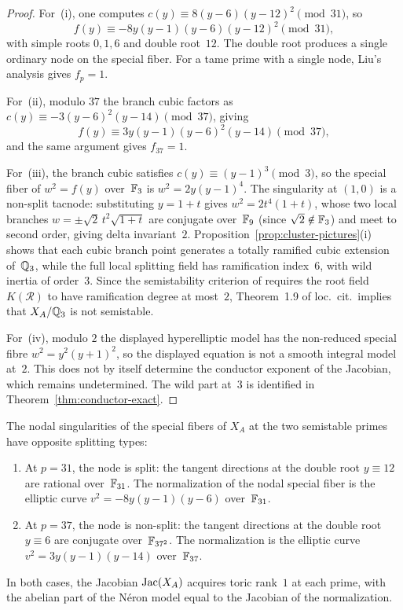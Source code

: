 \begin{proof}
For~(i), one computes \(c(y)\equiv 8(y-6)(y-12)^2\pmod{31}\), so
\[
f(y)\equiv -8y(y-1)(y-6)(y-12)^2\pmod{31},
\]
with simple roots \(0,1,6\) and double root~\(12\). The double root produces a single ordinary node on the special fiber. For a tame prime with a single node, Liu's analysis \cite{Liu2002} gives \(f_p=1\).

For~(ii), modulo \(37\) the branch cubic factors as \(c(y)\equiv -3(y-6)^2(y-14)\pmod{37}\), giving
\[
f(y)\equiv 3y(y-1)(y-6)^2(y-14)\pmod{37},
\]
and the same argument gives \(f_{37}=1\).

For~(iii), the branch cubic satisfies \(c(y)\equiv (y-1)^3\pmod{3}\), so the special fiber of \(w^2=f(y)\) over~\(\mathbb{F}_3\) is \(w^2=2y(y-1)^4\). The singularity at \((1,0)\) is a non-split tacnode: substituting \(y=1+t\) gives \(w^2=2t^4(1+t)\), whose two local branches \(w=\pm\sqrt{2}\,t^2\sqrt{1+t}\) are conjugate over~\(\mathbb{F}_9\) (since \(\sqrt{2}\notin\mathbb{F}_3\)) and meet to second order, giving delta invariant~\(2\). Proposition~\ref{prop:cluster-pictures}(i) shows that each cubic branch point generates a totally ramified cubic extension of~\(\mathbb{Q}_3\), while the full local splitting field has ramification index~\(6\), with wild inertia of order~\(3\). Since the semistability criterion of \cite[Definition~1.8]{DDMM2023} requires the root field \(K(\mathcal R)\) to have ramification degree at most~\(2\), Theorem~1.9 of loc.\ cit.\ implies that \(X_A/\mathbb{Q}_3\) is not semistable.

For~(iv), modulo \(2\) the displayed hyperelliptic model has the non-reduced special fibre \(w^2=y^2(y+1)^2\), so the displayed equation is not a smooth integral model at~\(2\). This does not by itself determine the conductor exponent of the Jacobian, which remains undetermined. The wild part at~\(3\) is identified in Theorem~\ref{thm:conductor-exact}.
\end{proof}

\begin{proposition}\label{prop:node-type}
The nodal singularities of the special fibers of \(X_A\) at the two semistable primes have opposite splitting types:
\begin{enumerate}
\item[(i)] At \(p=31\), the node is split: the tangent directions at the double root \(y\equiv 12\) are rational over~\(\mathbb{F}_{31}\). The normalization of the nodal special fiber is the elliptic curve \(v^2=-8y(y-1)(y-6)\) over~\(\mathbb{F}_{31}\).
\item[(ii)] At \(p=37\), the node is non-split: the tangent directions at the double root \(y\equiv 6\) are conjugate over~\(\mathbb{F}_{37^2}\). The normalization is the elliptic curve \(v^2=3y(y-1)(y-14)\) over~\(\mathbb{F}_{37}\).
\end{enumerate}
In both cases, the Jacobian \(\operatorname{Jac}(X_A)\) acquires toric rank~\(1\) at each prime, with the abelian part of the N\'eron model equal to the Jacobian of the normalization.
\end{proposition}

